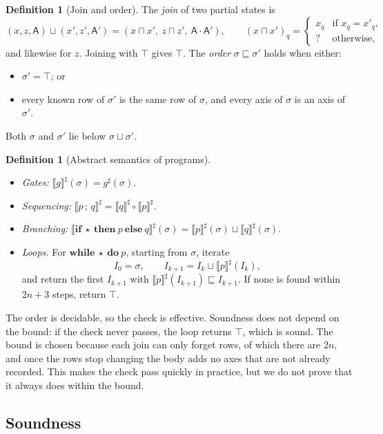\documentclass[11pt]{article}
\theoremstyle{definition}
\newtheorem{definition}[theorem]{Definition}
\theoremstyle{remark}
\newcommand{\abs}[1]{\llbracket #1 \rrbracket^{\sharp}}
\newcommand{\Ax}{\mathsf{A}}
\begin{document}
\begin{definition}[Join and order]
The \emph{join} of two partial states is
\[
  (x, z, \Ax) \sqcup (x', z', \Ax') = (x \sqcap x',\ z \sqcap z',\ \Ax \cdot \Ax'),
  \qquad
  (x \sqcap x')_q = \begin{cases} x_q & \text{if } x_q = x'_q, \\ ? & \text{otherwise,} \end{cases}
\]
and likewise for $z$. Joining with $\top$ gives $\top$. The \emph{order}
$\sigma \sqsubseteq \sigma'$ holds when either:
\begin{itemize}[nosep]
  \item $\sigma' = \top$; or
  \item every known row of $\sigma'$ is the same row of $\sigma$, and every axis of
  $\sigma$ is an axis of $\sigma'$.
\end{itemize}
Both $\sigma$ and $\sigma'$ lie below $\sigma \sqcup \sigma'$.
\end{definition}

\begin{definition}[Abstract semantics of programs]
\leavevmode
\begin{itemize}[nosep]
  \item \emph{Gates:} $\abs{g}(\sigma) = g^\sharp(\sigma)$.
  \item \emph{Sequencing:} $\abs{p\,;\,q} = \abs{q} \circ \abs{p}$.
  \item \emph{Branching:} $\abs{\textbf{if}\ \star\ \textbf{then}\ p\ \textbf{else}\ q}(\sigma) =
  \abs{p}(\sigma) \sqcup \abs{q}(\sigma)$.
  \item \emph{Loops.} For $\textbf{while}\ \star\ \textbf{do}\ p$, starting from $\sigma$,
  iterate
  \[
    I_0 = \sigma, \qquad I_{k+1} = I_k \sqcup \abs{p}(I_k),
  \]
  and return the first $I_{k+1}$ with $\abs{p}(I_{k+1}) \sqsubseteq I_{k+1}$. If none is
  found within $2n + 3$ steps, return $\top$.
\end{itemize}
The order is decidable, so the check is effective. Soundness does not depend on the bound:
if the check never passes, the loop returns $\top$, which is sound. The bound is chosen
because each join can only forget rows, of which there are $2n$, and once the rows stop
changing the body adds no axes that are not already recorded. This makes the check pass
quickly in practice, but we do not prove that it always does within the bound.
\end{definition}

\subsection{Soundness}
\end{document}
